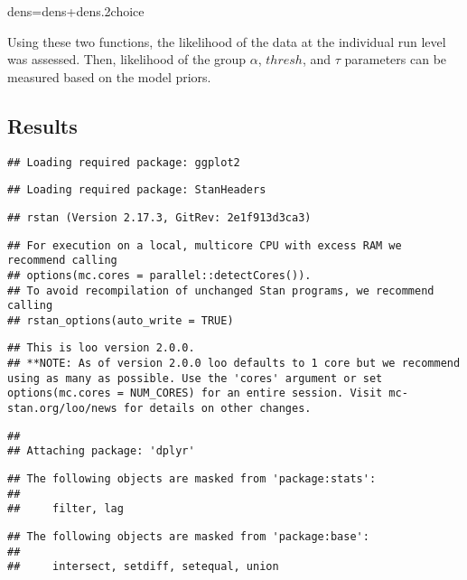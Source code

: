 \documentclass[]{article}
\newenvironment{Shaded}{\begin{snugshade}}{\end{snugshade}}
\newcommand{\NormalTok}[1]{{#1}}
\begin{document}
\begin{Shaded}
\begin{Highlighting}[]
\NormalTok{dens=dens+dens.2choice}
\end{Highlighting}
\end{Shaded}

Using these two functions, the likelihood of the data at the individual
run level was assessed. Then, likelihood of the group \(\alpha\),
\(thresh\), and \(\tau\) parameters can be measured based on the model
priors.

\subsection{Results}\label{results}

\begin{verbatim}
## Loading required package: ggplot2
\end{verbatim}

\begin{verbatim}
## Loading required package: StanHeaders
\end{verbatim}

\begin{verbatim}
## rstan (Version 2.17.3, GitRev: 2e1f913d3ca3)
\end{verbatim}

\begin{verbatim}
## For execution on a local, multicore CPU with excess RAM we recommend calling
## options(mc.cores = parallel::detectCores()).
## To avoid recompilation of unchanged Stan programs, we recommend calling
## rstan_options(auto_write = TRUE)
\end{verbatim}

\begin{verbatim}
## This is loo version 2.0.0.
## **NOTE: As of version 2.0.0 loo defaults to 1 core but we recommend using as many as possible. Use the 'cores' argument or set options(mc.cores = NUM_CORES) for an entire session. Visit mc-stan.org/loo/news for details on other changes.
\end{verbatim}

\begin{verbatim}
## 
## Attaching package: 'dplyr'
\end{verbatim}

\begin{verbatim}
## The following objects are masked from 'package:stats':
## 
##     filter, lag
\end{verbatim}

\begin{verbatim}
## The following objects are masked from 'package:base':
## 
##     intersect, setdiff, setequal, union
\end{verbatim}
\end{document}

